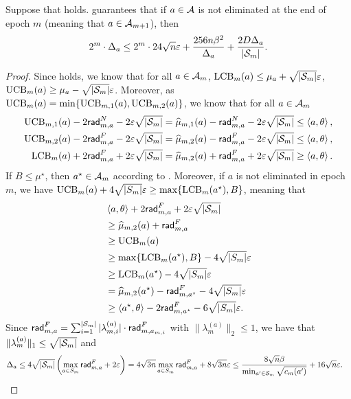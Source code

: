 \begin{lemma}\label{lem:delta_1_reward_miss}
    Suppose that  holds.  guarantees that if $a\in{\mathcal{A}}$ is not eliminated at the end of epoch $m$ (meaning that $a\in {\mathcal{A}}_{m+1}$), then 
    \begin{align*}
        2^m\cdot \Delta_a\leq 2^m\cdot 24\sqrt{n}\varepsilon+\frac{256n\beta^2}{\Delta_a} + \frac{2D\Delta_a}{|{\mathcal{S}}_m|}.
    \end{align*}
\end{lemma}
\begin{proof}
    Since  holds, we know that for all $a\in{\mathcal{A}}_m$, ${\operatorname{LCB}}_m(a)\leq \mu_a + \sqrt{|{\mathcal{S}}_m|}\varepsilon$, ${\operatorname{UCB}}_m(a)\geq \mu_a - \sqrt{|{\mathcal{S}}_m|}\varepsilon$. Moreover, as ${\operatorname{UCB}}_m(a)=\min\{{\operatorname{UCB}}_{m,1}(a),{\operatorname{UCB}}_{m,2}(a)\}$, we know that for all $a\in {\mathcal{A}}_m$
    \begin{align*}
        {\operatorname{UCB}}_{m,1}(a) - 2\mathsf{rad}_{m,a}^{N} - 2\varepsilon\sqrt{|{\mathcal{S}}_m|}=  \widehat{\mu}_{m,1}(a) - \mathsf{rad}_{m,a}^{N} - 2\varepsilon\sqrt{|{\mathcal{S}}_m|}\leq \left\langle {a,\theta} \right\rangle,\\
        {\operatorname{UCB}}_{m,2}(a) - 2\mathsf{rad}_{m,a}^{F} - 2\varepsilon\sqrt{|{\mathcal{S}}_m|}=  \widehat{\mu}_{m,2}(a) - \mathsf{rad}_{m,a}^{F} - 2\varepsilon\sqrt{|{\mathcal{S}}_m|}\leq \left\langle {a,\theta} \right\rangle,\\
        {\operatorname{LCB}}_{m}(a) + 2\mathsf{rad}_{m,a}^{F} + 2\varepsilon\sqrt{|{\mathcal{S}}_m|} = \widehat{\mu}_{m,2}(a) + \mathsf{rad}_{m,a}^{F}+2\varepsilon\sqrt{|{\mathcal{S}}_m|}\geq \left\langle {a,\theta} \right\rangle.        
    \end{align*}
    If $B\leq \mu^\star$, then $a^\star\in {\mathcal{A}}_m$ according to .
    Moreover, if $a$ is not eliminated in epoch $m$, we have ${\operatorname{UCB}}_m(a)+4\sqrt{|S_m|}\varepsilon\geq \max\{{\operatorname{LCB}}_m(a^\star),B\}$, meaning that
    \begin{align*}
        &\left\langle {a,\theta} \right\rangle + 2\mathsf{rad}_{m,a}^{F} + 2\varepsilon\sqrt{|{\mathcal{S}}_m|} \\
        &\geq \widehat{\mu}_{m,2}(a) + \mathsf{rad}_{m,a}^{F} \\
        &\geq {\operatorname{UCB}}_m(a) \\
        &\geq \max\{{\operatorname{LCB}}_m(a^\star),B\}-4\sqrt{|S_m|}\varepsilon \\
        &\geq {\operatorname{LCB}}_m(a^\star) - 4\sqrt{|S_m|}\varepsilon \\
        &= \widehat{\mu}_{m,2}(a^\star) - \mathsf{rad}_{m,a^\star}^{F} - 4\sqrt{|S_m|}\varepsilon \\
        &\geq \left\langle {a^\star,\theta} \right\rangle  - 2\mathsf{rad}_{m,a^\star}^{F} - 6\sqrt{|S_m|}\varepsilon.
    \end{align*}
    Since $\mathsf{rad}_{m,a}^F = \sum_{i=1}^{|{\mathcal{S}}_m|}|\lambda_{m,i}^{(a)}|\cdot \mathsf{rad}_{m,a_{m,i}}^{F}$ with $\|\lambda_{m}^{(a)}\|_2\leq 1$, we have that $\|\lambda_{m}^{(a)}\|_1\leq \sqrt{|{\mathcal{S}}_m|}$ and
    \begin{align*}
        &\Delta_a\leq 4\sqrt{|{\mathcal{S}}_m|}\left(\max_{a\in S_m}\mathsf{rad}_{m,a}^{F}+2\varepsilon\right)= 4\sqrt{3n}\max_{a\in S_m}\mathsf{rad}_{m,a}^{F}+8\sqrt{3n}\varepsilon \leq \frac{8\sqrt{n}\beta}{\min_{a'\in {\mathcal{S}}_m}\sqrt{c_m(a')}}+16\sqrt{n}\varepsilon.
    \end{align*}
    

\end{proof}
